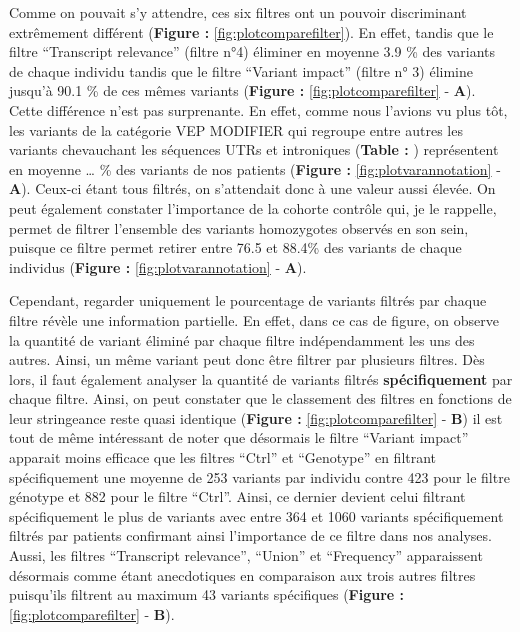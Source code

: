 \documentclass[12pt,twoside]{reedthesis}
\theoremstyle{definition}
\theoremstyle{definition}
\theoremstyle{remark}
\begin{document}
  \newpage
  
  \newpage
  
  Comme on pouvait s'y attendre, ces six filtres ont un pouvoir
  discriminant extrêmement différent (\textbf{Figure :}
  \ref{fig:plotcomparefilter}). En effet, tandis que le filtre
  ``Transcript relevance'' (filtre n°4) éliminer en moyenne 3.9 \% des
  variants de chaque individu tandis que le filtre ``Variant impact''
  (filtre n° 3) élimine jusqu'à 90.1 \% de ces mêmes variants
  (\textbf{Figure :} \ref{fig:plotcomparefilter} - \textbf{A}). Cette
  différence n'est pas surprenante. En effet, comme nous l'avions vu plus
  tôt, les variants de la catégorie VEP MODIFIER qui regroupe entre autres
  les variants chevauchant les séquences UTRs et introniques
  (\textbf{Table :} ) représentent en moyenne \ldots{} \% des variants de
  nos patients (\textbf{Figure :} \ref{fig:plotvarannotation} -
  \textbf{A}). Ceux-ci étant tous filtrés, on s'attendait donc à une
  valeur aussi élevée. On peut également constater l'importance de la
  cohorte contrôle qui, je le rappelle, permet de filtrer l'ensemble des
  variants homozygotes observés en son sein, puisque ce filtre permet
  retirer entre 76.5 et 88.4\% des variants de chaque individus
  (\textbf{Figure :} \ref{fig:plotvarannotation} - \textbf{A}).
  
  Cependant, regarder uniquement le pourcentage de variants filtrés par
  chaque filtre révèle une information partielle. En effet, dans ce cas de
  figure, on observe la quantité de variant éliminé par chaque filtre
  indépendamment les uns des autres. Ainsi, un même variant peut donc être
  filtrer par plusieurs filtres. Dès lors, il faut également analyser la
  quantité de variants filtrés \textbf{spécifiquement} par chaque filtre.
  Ainsi, on peut constater que le classement des filtres en fonctions de
  leur stringeance reste quasi identique (\textbf{Figure :}
  \ref{fig:plotcomparefilter} - \textbf{B}) il est tout de même
  intéressant de noter que désormais le filtre ``Variant impact'' apparait
  moins efficace que les filtres ``Ctrl'' et ``Genotype'' en filtrant
  spécifiquement une moyenne de 253 variants par individu contre 423 pour
  le filtre génotype et 882 pour le filtre ``Ctrl''. Ainsi, ce dernier
  devient celui filtrant spécifiquement le plus de variants avec entre 364
  et 1060 variants spécifiquement filtrés par patients confirmant ainsi
  l'importance de ce filtre dans nos analyses. Aussi, les filtres
  ``Transcript relevance'', ``Union'' et ``Frequency'' apparaissent
  désormais comme étant anecdotiques en comparaison aux trois autres
  filtres puisqu'ils filtrent au maximum 43 variants spécifiques
  (\textbf{Figure :} \ref{fig:plotcomparefilter} - \textbf{B}).
  
\end{document}
